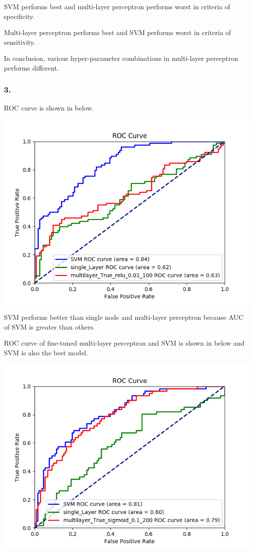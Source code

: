 \documentclass{article}
\begin{document}
SVM performs best and multi-layer perceptron performs worst in criteria of specificity.

Multi-layer perceptron performs best and SVM performs worst in criteria of sensitivity.

In conclusion, various hyper-parameter combinations in multi-layer perceptron performs different.

\subsubsection{3.}

ROC curve is shown in below.

\includegraphics[scale=0.5]{roc_curve.png}

SVM performs better than single node and multi-layer perceptron because AUC of SVM is greater than others.

ROC curve of fine-tuned multi-layer perceptron and SVM is shown in below and SVM is also the best model.

\includegraphics[scale=0.5]{roc_curve_fine_tune.png}
\end{document}
